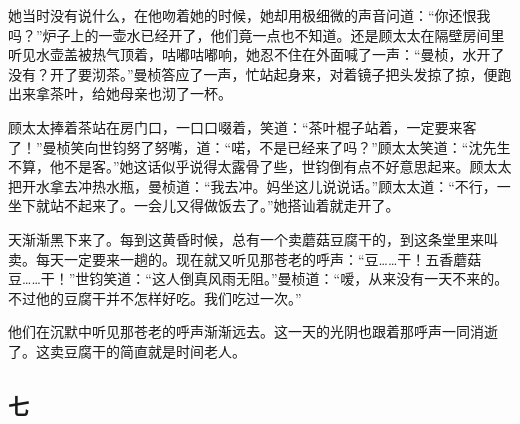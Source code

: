 \par 她当时没有说什么，在他吻着她的时候，她却用极细微的声音问道：“你还恨我吗？”炉子上的一壶水已经开了，他们竟一点也不知道。还是顾太太在隔壁房间里听见水壶盖被热气顶着，咕嘟咕嘟响，她忍不住在外面喊了一声：“曼桢，水开了没有？开了要沏茶。”曼桢答应了一声，忙站起身来，对着镜子把头发掠了掠，便跑出来拿茶叶，给她母亲也沏了一杯。
\par 顾太太捧着茶站在房门口，一口口啜着，笑道：“茶叶棍子站着，一定要来客了！”曼桢笑向世钧努了努嘴，道：“喏，不是已经来了吗？”顾太太笑道：“沈先生不算，他不是客。”她这话似乎说得太露骨了些，世钧倒有点不好意思起来。顾太太把开水拿去冲热水瓶，曼桢道：“我去冲。妈坐这儿说说话。”顾太太道：“不行，一坐下就站不起来了。一会儿又得做饭去了。”她搭讪着就走开了。
\par 天渐渐黑下来了。每到这黄昏时候，总有一个卖蘑菇豆腐干的，到这条堂里来叫卖。每天一定要来一趟的。现在就又听见那苍老的呼声：“豆……干！五香蘑菇豆……干！”世钧笑道：“这人倒真风雨无阻。”曼桢道：“嗳，从来没有一天不来的。不过他的豆腐干并不怎样好吃。我们吃过一次。”
\par 他们在沉默中听见那苍老的呼声渐渐远去。这一天的光阴也跟着那呼声一同消逝了。这卖豆腐干的简直就是时间老人。


\subsection{七}

